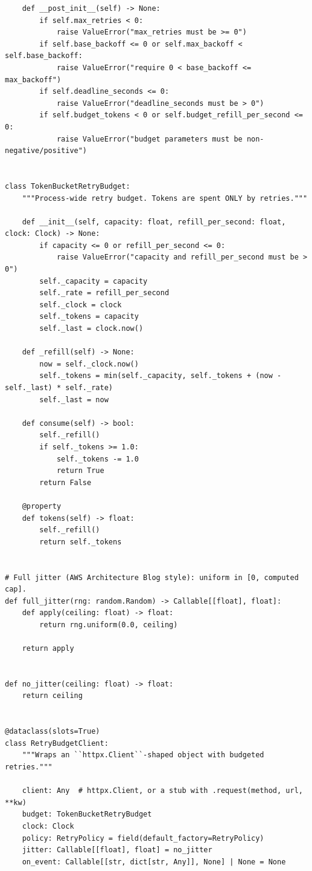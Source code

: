\begin{verbatim}
    def __post_init__(self) -> None:
        if self.max_retries < 0:
            raise ValueError("max_retries must be >= 0")
        if self.base_backoff <= 0 or self.max_backoff < self.base_backoff:
            raise ValueError("require 0 < base_backoff <= max_backoff")
        if self.deadline_seconds <= 0:
            raise ValueError("deadline_seconds must be > 0")
        if self.budget_tokens < 0 or self.budget_refill_per_second <= 0:
            raise ValueError("budget parameters must be non-negative/positive")


class TokenBucketRetryBudget:
    """Process-wide retry budget. Tokens are spent ONLY by retries."""

    def __init__(self, capacity: float, refill_per_second: float, clock: Clock) -> None:
        if capacity <= 0 or refill_per_second <= 0:
            raise ValueError("capacity and refill_per_second must be > 0")
        self._capacity = capacity
        self._rate = refill_per_second
        self._clock = clock
        self._tokens = capacity
        self._last = clock.now()

    def _refill(self) -> None:
        now = self._clock.now()
        self._tokens = min(self._capacity, self._tokens + (now - self._last) * self._rate)
        self._last = now

    def consume(self) -> bool:
        self._refill()
        if self._tokens >= 1.0:
            self._tokens -= 1.0
            return True
        return False

    @property
    def tokens(self) -> float:
        self._refill()
        return self._tokens


# Full jitter (AWS Architecture Blog style): uniform in [0, computed cap].
def full_jitter(rng: random.Random) -> Callable[[float], float]:
    def apply(ceiling: float) -> float:
        return rng.uniform(0.0, ceiling)

    return apply


def no_jitter(ceiling: float) -> float:
    return ceiling


@dataclass(slots=True)
class RetryBudgetClient:
    """Wraps an ``httpx.Client``-shaped object with budgeted retries."""

    client: Any  # httpx.Client, or a stub with .request(method, url, **kw)
    budget: TokenBucketRetryBudget
    clock: Clock
    policy: RetryPolicy = field(default_factory=RetryPolicy)
    jitter: Callable[[float], float] = no_jitter
    on_event: Callable[[str, dict[str, Any]], None] | None = None


\end{verbatim}
